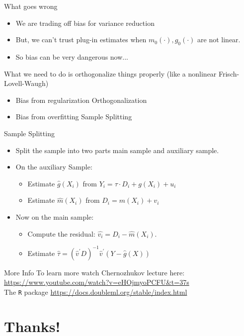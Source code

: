 \begin{frame}{What goes wrong}
\begin{itemize}
\item We are trading off \alert{bias} for \alert{variance reduction}
\item But, we can't trust \alert{plug-in} estimates when $m_0(\cdot),g_0(\cdot)$ are not linear.
\item So bias can be very dangerous now...
\end{itemize}
What we need to do is \alert{orthogonalize} things properly (like a nonlinear Frisch-Lovell-Waugh)
\begin{itemize}
\item Bias from \alert{regularization} \textrightarrow Orthogonalization
\item Bias from \alert{overfitting} \textrightarrow Sample Splitting
\end{itemize}
\end{frame}



\begin{frame}{Sample Splitting}

\begin{itemize}
\item Split the sample into two parts \alert{main sample} and \alert{auxiliary sample}.
\item On the auxiliary Sample:
\begin{itemize}
\item Estimate $\widehat{g}(X_i)$ from $Y_i = \tau \cdot D_i + g(X_i) + u_i $
\item Estimate $\widehat{m}(X_i)$ from $D_i =  m(X_i) + v_i $
\end{itemize}
\item Now on the main sample:
\begin{itemize}
\item Compute the residual:  $\widehat{v_i} = D_i - \widehat{m}(X_i)$.
\item Estimate $\hat{\tau}=\left(\hat{v}^{\prime} D\right)^{-1} \hat{v}^{\prime}(Y-\hat{g}(X))$
\end{itemize}
\end{itemize}

\end{frame}

\begin{frame}{More Info}
To learn more watch Chernozhukov lecture here:
\url{https://www.youtube.com/watch?v=eHOjmyoPCFU&t=37s}\\

The \texttt{R} package
\url{https://docs.doubleml.org/stable/index.html}
\end{frame}



\section*{Thanks!}




